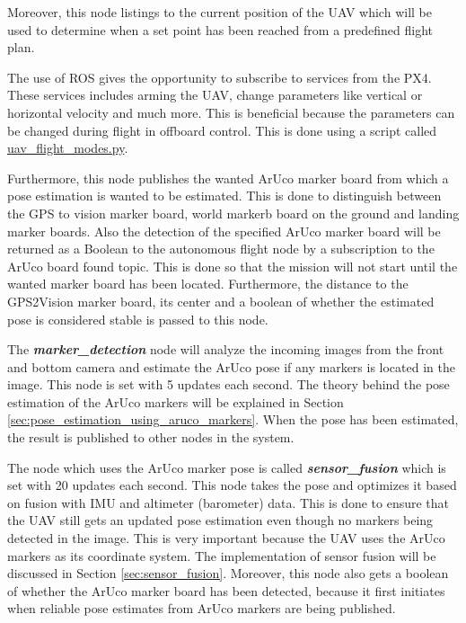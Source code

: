 \documentclass[../Head/report.tex]{subfiles}
\begin{document}
Moreover, this node listings to the current position of the UAV which will be used to determine when a set point has been reached from a predefined flight plan.

The use of ROS gives the opportunity to subscribe to services from the PX4. These services includes arming the UAV, change parameters like vertical or horizontal velocity and much more. This is beneficial because the parameters can be changed during flight in offboard control. This is done using a script called \href{https://github.com/Kenil16/master\_project/blob/master/software/ros\_workspace/src/offboard\_control/uav\_flight\_modes.py}{uav\_flight\_modes.py}. 	

Furthermore, this node publishes the wanted ArUco marker board from which a pose estimation is wanted to be estimated. This is done to distinguish between the GPS to vision marker board, world markerb board on the ground and landing marker boards. Also the detection of the specified ArUco marker board will be returned as a Boolean to the autonomous flight node by a subscription to the ArUco board found topic. This is done so that the mission will not start until the wanted marker board has been located. Furthermore, the distance to the GPS2Vision marker board, its center and a boolean of whether the estimated pose is considered stable is passed to this node.  

The \textit{\textbf{marker\_detection}} node will analyze the incoming images from the front and bottom camera and estimate the ArUco pose if any markers is located in the image. This node is set with 5 updates each second. The theory behind the pose estimation of the ArUco markers will be explained in Section \ref{sec:pose_estimation_using_aruco_markers}. When the pose has been estimated, the result is published to other nodes in the system.

The node which uses the ArUco marker pose is called \textit{\textbf{sensor\_fusion}} which is set with 20 updates each second. This node takes the pose and optimizes it based on fusion with IMU and altimeter (barometer) data. This is done to ensure that the UAV still gets an updated pose estimation even though no markers being detected in the image. This is very important because the UAV uses the ArUco markers as its coordinate system. The implementation of sensor fusion will be discussed in Section \ref{sec:sensor_fusion}. Moreover, this node also gets a boolean of whether the ArUco marker board has been detected, because it first initiates when reliable pose estimates from ArUco markers are being published. 
\end{document}
